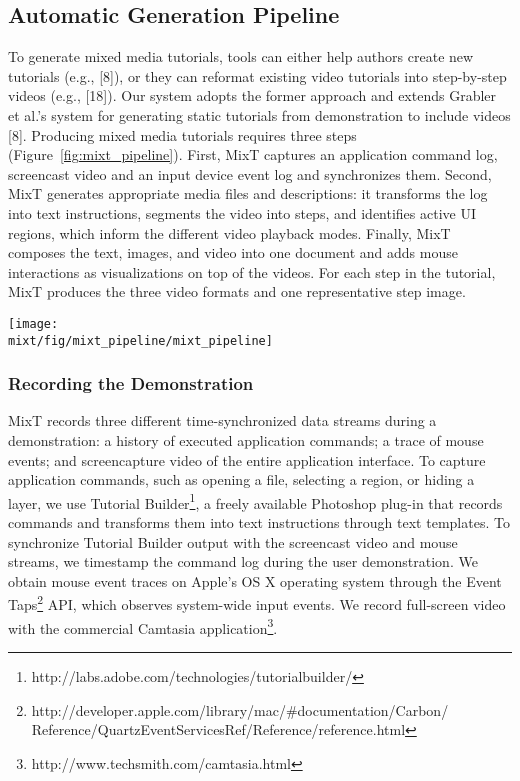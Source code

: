 \subsection{Automatic Generation Pipeline}

To generate mixed media tutorials, tools can either help authors create new tutorials (e.g., [8]), or they can reformat existing video tutorials into step-by-step videos (e.g., [18]). Our system adopts the former approach and extends Grabler et al.{}'s system for generating static tutorials from demonstration to include videos [8]. Producing mixed media tutorials requires three steps (Figure~\ref{fig:mixt_pipeline}). First, MixT captures an application command log, screencast video and an input device event log and synchronizes them. Second, MixT generates appropriate media files and descriptions: it transforms the log into text instructions, segments the video into steps, and identifies active UI regions, which inform the different video playback modes. Finally, MixT composes the text, images, and video into one document and adds mouse interactions as visualizations on top of the videos. For each step in the tutorial, MixT produces the three video formats and one representative step image.

\begin{figure*}[t]
  \centering
  \texttt{[image: \\mixt/fig/mixt\_pipeline/mixt\_pipeline]}
  \caption{MixT generates tutorials from video and log files.}
  \label{fig:mixt_pipeline}
\end{figure*}

\subsubsection{Recording the Demonstration}
MixT records three different time-synchronized data streams during a demonstration: a history of executed application commands; a trace of mouse events; and screencapture video of the entire application interface. To capture application commands, such as opening a file, selecting a region, or hiding a layer, we use Tutorial Builder\footnote{http://labs.adobe.com/technologies/tutorialbuilder/}, a freely available Photoshop plug-in that records commands and transforms them into text instructions through text templates. To synchronize Tutorial Builder output with the screencast video and mouse streams, we timestamp the command log during the user demonstration. We obtain mouse event traces on Apple’s OS X operating system through the Event Taps\footnote{http://developer.apple.com/library/mac/\#documentation/Carbon/\newline
Reference/QuartzEventServicesRef/Reference/reference.html} API, which observes system-wide input events. We record full-screen video with the commercial Camtasia application\footnote{http://www.techsmith.com/camtasia.html}.

